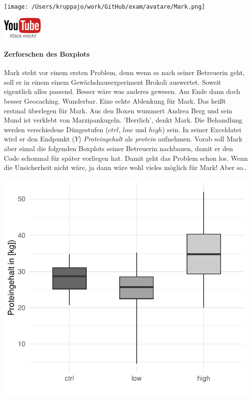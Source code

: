 \documentclass[a4paper, 9pt]{scrartcl}\usepackage[]{graphicx}\usepackage[]{xcolor}
\makeatletter
\def\maxwidth{ %
  \ifdim\Gin@nat@width>\linewidth
    \linewidth
  \else
    \Gin@nat@width
  \fi
}
\makeatother
\begin{document}
 
\begin{minipage}[t]{0.5\textwidth}
\texttt{[image: /Users/kruppajo/work/GitHub/exam/avatare/Mark.png]}
\end{minipage}
\begin{minipage}[t]{0.5\textwidth}
\hfill
\href{https://youtu.be/Xf0yE-o7bEU}{\includegraphics[width = 2cm]{img/youtube}}
\end{minipage}
\vspace{-3ex}



\paragraph{Zerforschen des Boxplots}

Mark steht vor einem ersten Problem, denn wenn es nach seiner Betreuerin geht, soll er in einem einem Gewächshausexperiment Brokoli auswertet. Soweit eigentlich alles passend. Besser wäre was anderes gewesen. Am Ende dann doch besser Geocaching. Wunderbar. Eine echte Ablenkung für Mark. Das heißt erstmal überlegen für Mark. Aus den Boxen wummert Andrea Berg und sein Mund ist verklebt von Marzipankugeln. 'Herrlich', denkt Mark. Die Behandlung werden verschiedene Düngestufen ($ctrl$, $low$ und $high$) sein. In seiner Exceldatei wird er den Endpunkt ($Y$) \textit{Proteingehalt} als \textit{protein} aufnehmen. Vorab soll Mark aber eimal die folgenden Boxplots seiner Betreuerin nachbauen, damit er den \Rlogo Code schonmal für später vorliegen hat. Damit geht das Problem schon los. Wenn die Unsicherheit nicht wäre, ja dann wäre wohl vieles möglich für Mark! Aber so..



{\centering \includegraphics[width=\maxwidth]{img/boxplot-02-zer-1} 

}
\end{document}

